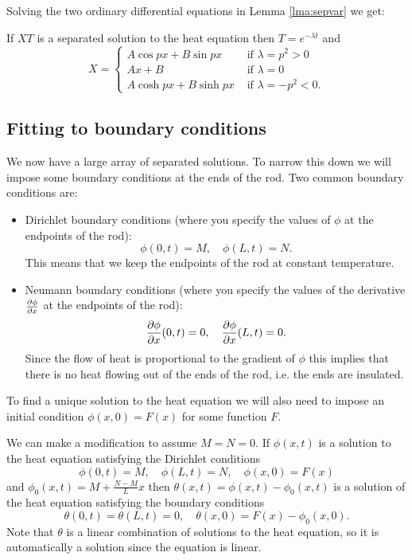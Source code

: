 Solving the two ordinary differential equations in Lemma \ref{lma:sepvar} we get:

\begin{cor}
If $XT$ is a separated solution to the heat equation then $T=e^{-\lambda t}$ and
\[
X=\begin{cases}
  A\cos px+B\sin px&\mbox{ if }\lambda=p^2>0\\
  Ax+B&\mbox{ if }\lambda=0\\
  A\cosh px+B\sinh px&\mbox{ if }\lambda=-p^2<0.
\end{cases}
\]
\end{cor}

\subsection{Fitting to boundary conditions}

We now have a large array of separated solutions. To narrow this down we will impose some boundary conditions at the ends of the rod. Two common boundary conditions are:
\begin{itemize}
\item Dirichlet boundary conditions (where you specify the values of $\phi$ at the endpoints of the rod):
\[\phi(0,t)=M,\quad\phi(L,t)=N.\]
This means that we keep the endpoints of the rod at constant temperature.
\item Neumann boundary conditions (where you specify the values of the derivative $\frac{\partial \phi}{\partial x}$ at the endpoints of the rod):
\[\frac{\partial \phi}{\partial x}(0,t)=0,\quad\frac{\partial \phi}{\partial x}(L,t)=0.\]
Since the flow of heat is proportional to the gradient of $\phi$ this implies that there is no heat flowing out of the ends of the rod, i.e. the ends are insulated.
\end{itemize}
To find a unique solution to the heat equation we will also need to impose an initial condition $\phi(x,0)=F(x)$ for some function $F$.

\begin{rmk}\label{rmk:modify}
We can make a modification to assume $M=N=0$. If $\phi(x,t)$ is a solution to the heat equation satisfying the Dirichlet conditions
\[\phi(0,t)=M,\quad\phi(L,t)=N,\quad\phi(x,0)=F(x)\]
and $\phi_0(x,t)=M+\frac{N-M}{L}x$ then $\theta(x,t)=\phi(x,t)-\phi_0(x,t)$ is a solution of the heat equation satisfying the boundary conditions
\[\theta(0,t)=\theta(L,t)=0,\quad\theta(x,0)=F(x)-\phi_0(x,0).\]
Note that $\theta$ is a linear combination of solutions to the heat equation, so it is automatically a solution since the equation is linear.
\end{rmk}


